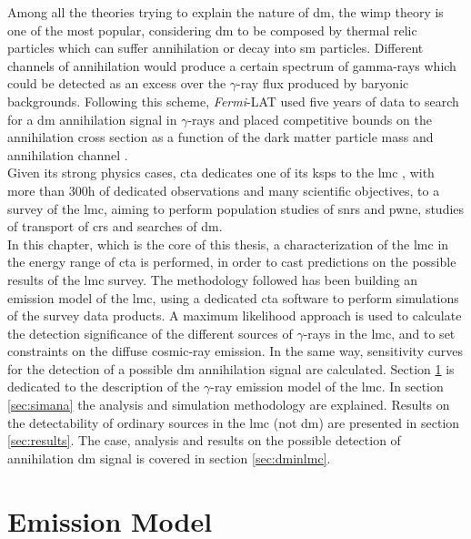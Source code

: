 \documentclass[main.tex]{subfiles}
\begin{document}
Among all the theories trying to explain the nature of \gls{dm}, the \gls{wimp} theory is one of the most popular, considering \gls{dm} to be composed by thermal relic particles which can suffer annihilation or decay into \gls{sm} particles. Different channels of annihilation would produce a certain spectrum of gamma-rays \cite{2011cirelli} which could be detected as an excess over the $\gamma$-ray flux produced by baryonic backgrounds. Following this scheme, \textit{Fermi}-LAT used five years of data to search for a \gls{dm} annihilation signal in $\gamma$-rays and placed competitive bounds on the annihilation cross section as a function of the dark matter particle mass and annihilation channel \cite{2010FermiLATLMC11months}.\\

Given its strong physics cases, \gls{cta} dedicates one of its \glspl{ksp} to the \gls{lmc} \cite{2019SciencewithCTA}, with more than 300h of dedicated observations and many scientific objectives, to a survey of the \gls{lmc}, aiming to perform population studies of \glspl{snr} and \gls{pwne}, studies of transport of \glspl{cr} and searches of \gls{dm}.\\
In this chapter, which is the core of this thesis, a characterization of the \gls{lmc} in the energy range of \gls{cta} is performed, in order to cast predictions on the possible results of the \gls{lmc} survey. The methodology followed has been building an emission model of the \gls{lmc}, using a dedicated \gls{cta} software to perform simulations of the survey data products. A maximum likelihood approach is used to calculate the detection significance of the different sources of $\gamma$-rays in the \gls{lmc}, and to set constraints on the diffuse cosmic-ray emission. In the same way, sensitivity curves for the detection of a possible \gls{dm} annihilation signal are calculated. Section \ref{sec:model} is dedicated to the description of the $\gamma$-ray emission model of the \gls{lmc}. In section \ref{sec:simana} the analysis and simulation methodology are explained. Results on the detectability of ordinary sources in the \gls{lmc} (not \gls{dm}) are presented in section \ref{sec:results}. The case, analysis and results on the possible detection of annihilation \gls{dm} signal is covered in section \ref{sec:dminlmc}.  

\section{Emission Model} \label{sec:model}
\end{document}
